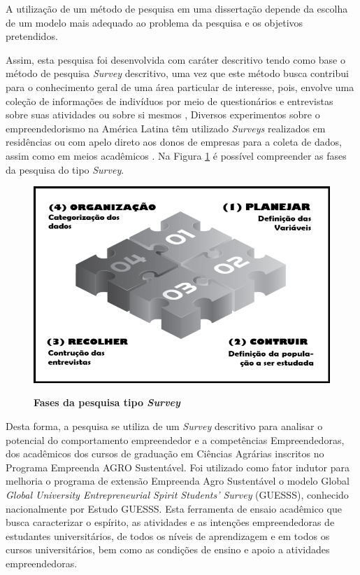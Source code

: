 A utilização de um método de pesquisa em uma dissertação depende da escolha de um modelo mais adequado ao problema da pesquisa e os objetivos pretendidos.

Assim, esta pesquisa foi desenvolvida com caráter descritivo tendo como base o método de pesquisa \textit{Survey} descritivo, uma vez que este método busca contribui para o conhecimento geral de uma área particular de interesse, pois, envolve uma coleção de informações de indivíduos por meio de questionários e entrevistas sobre suas atividades ou sobre si mesmos \cite{forza_survey_2002}, Diversos experimentos sobre o empreendedorismo na América Latina têm utilizado  \textit{Surveys} realizados em residências ou com apelo direto aos donos de empresas para a coleta de dados, assim como em meios acadêmicos \cite{lima_ser_2015}. Na Figura \ref{figura_8} é possível compreender as fases da pesquisa do tipo \textit{Survey}.

\begin{figure}[H]
\centering
\caption{\textbf{Fases da pesquisa tipo \textit{Survey}}}
\includegraphics[scale=0.5]{Imagens/survey.png}
\label{figura_8}
\end{figure}

Desta forma, a pesquisa se utiliza de um \textit{Survey} descritivo para analisar o potencial do comportamento empreendedor e a competências Empreendedoras, dos acadêmicos dos cursos de graduação em Ciências Agrárias inscritos no Programa Empreenda AGRO Sustentável. Foi utilizado como fator indutor para melhoria o programa de extensão Empreenda Agro Sustentável o modelo Global \textit{Global University Entrepreneurial Spirit Students’ Survey} (GUESSS), conhecido nacionalmente por Estudo GUESSS. Esta ferramenta de ensaio acadêmico que busca caracterizar o espírito, as atividades e as intenções empreendedoras de estudantes universitários, de todos os níveis de aprendizagem e em todos os cursos universitários, bem como as condições de ensino e apoio a atividades empreendedoras. 

